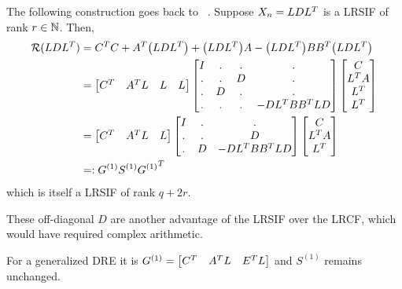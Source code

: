 The following construction goes back to \citeauthor*{Lang2015}~\cite{Lang2015}.
Suppose $X_n = LDL^T$ is a \ac{LRSIF} of rank $r\in\mathbb{N}$.
Then,
\begin{subequations}
\label{eq:ros:LR:ros2}
\begin{align}
  \operatorname{\mathcal R}(LDL^T)
  &= C^T C + A^T \big( LDL^T \big) + \big( LDL^T \big) A - \big( LDL^T \big) BB^T \big( LDL^T \big) \\
  &= \begin{bmatrix}
    C^T & A^T L & L & L
  \end{bmatrix}
  \begin{bmatrix}
    I & . & . & . \\
    . & . & D & . \\
    . & D & . & . \\
    . & . & . & - DL^T BB^T LD
  \end{bmatrix}
  \begin{bmatrix}
    C \\
    L^T A \\
    L^T \\
    L^T
  \end{bmatrix} \\
  \label{eq:ros:lr-condensed:2}
  &= \begin{bmatrix}
    C^T & A^T L & L
  \end{bmatrix}
  \begin{bmatrix}
    I & . & . \\
    . & . & D \\
    . & D & - DL^T BB^T LD
  \end{bmatrix}
  \begin{bmatrix}
    C \\
    L^T A \\
    L^T
  \end{bmatrix} \\
  &=: G^{(1)} S^{(1)} {G^{(1)}}^T
\end{align}
\end{subequations}
which is itself a \ac{LRSIF} of rank $q + 2r$.

\begin{remark}
  These off-diagonal $D$ are another advantage of the \ac{LRSIF} over the \ac{LRCF},
  which would have required complex arithmetic.
\end{remark}

\begin{remark}
  For a generalized \ac{DRE} it is $G^{(1)} = \begin{bmatrix}
    C^T & A^T L & E^T L
  \end{bmatrix}$ and $S^{(1)}$ remains unchanged.
\end{remark}

